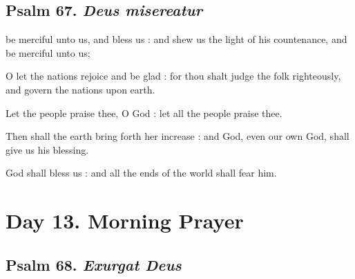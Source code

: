 \clearpage
\subsection{Psalm 67. \textit{Deus misereatur}}

 be merciful unto us, and bless us : and shew us the light of his countenance, and be merciful unto us;\par
{}
O let the nations rejoice and be glad : for thou shalt judge the folk righteously, and govern the nations upon earth.\par
{}Let the people praise thee, O God : let all the people praise thee.\par
{}Then shall the earth bring forth her increase : and God, even our own God, shall give us his blessing.\par
{}God shall bless us : and all the ends of the world shall fear him.\par

\section*{Day 13. Morning Prayer}

\subsection{Psalm 68. \textit{Exurgat Deus}}

